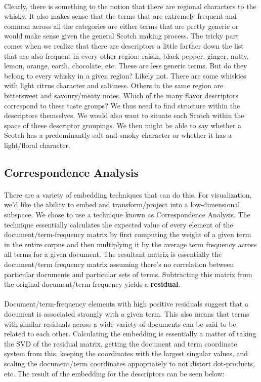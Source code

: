 \documentclass{article}
\begin{document}
	\paragraph{} Clearly, there is something to the notion that there are regional characters to the whisky. It also makes sense that the terms that are extremely frequent and common across all the categories are either terms that are pretty generic or would make sense given the general Scotch making process. The tricky part comes when we realize that there are descriptors a little farther down the list that are also frequent in every other region: raisin, black pepper, ginger, nutty, lemon, orange, earth, chocolate, etc. These are less generic terms. But do they belong to every whisky in a given region? Likely not. There are some whiskies with light citrus character and saltiness. Others in the same region are bittersweet and savoury/meaty notes. Which of the many flavor descriptors correspond to these taste groups? We thus need to find structure within the descriptors themselves. We would also want to situate each Scotch within the space of these descriptor groupings. We then might be able to say whether a Scotch has a predominantly salt and smoky character or whether it has a light/floral character.
	\subsection{Correspondence Analysis} \paragraph{} There are a variety of embedding techniques that can do this. For visualization, we'd like the ability to embed and transform/project into a low-dimensional subspace. We chose to use a technique known as Correspondence Analysis. The technique essentially calculates the expected value of every element of the document/term-frequency matrix by first computing the weight of a given term in the entire corpus and then multiplying it by the average term frequency across all terms for a given document. The resultant matrix is essentially the document/term frequency matrix assuming there's no correlation between particular documents and particular sets of terms. Subtracting this matrix from the original document/term-frequency 
	yields a \textbf{residual}.
	\paragraph{}  Document/term-frequency elements with high positive residuals suggest that a document is associated strongly with a given term. This also means that terms with similar residuals across a wide variety of documents can be said to be related to each other. Calculating the embedding is essentially a matter of taking the SVD of the residual matrix, getting the document and term coordinate system from this, keeping the coordinates with the largest singular values, and scaling the document/term coordinates appopriately to not distort dot-products, etc. The result of the embedding for the descriptors can be seen below: 
	
\end{document}
